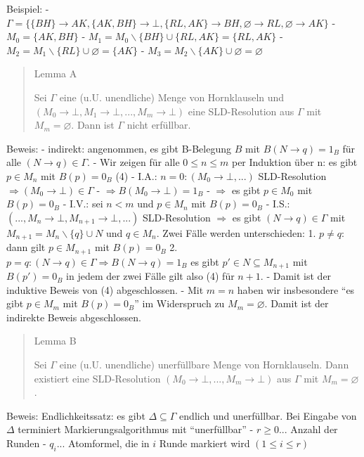 \documentclass[a4paper]{article}
\begin{document}
\begin{multicols}{3}
  Beispiel: -
  $\Gamma =\{\{BH\}\rightarrow AK,\{AK,BH\}\rightarrow\bot,\{RL,AK\}\rightarrow BH,\varnothing\rightarrow RL,\varnothing\rightarrow AK\}$
  - $M_0 =\{AK,BH\}$ - $M_1 =M_0 \backslash\{BH\}\cup\{RL,AK\}=\{RL,AK\}$
  - $M_2 =M_1 \backslash\{RL\}\cup\varnothing =\{AK\}$ -
  $M_3 =M_2 \backslash\{AK\}\cup\varnothing =\varnothing$

  \begin{quote}
    Lemma A

    Sei $\Gamma$ eine (u.U. unendliche) Menge von Hornklauseln und
    $(M_0\rightarrow\bot, M_1\rightarrow\bot,... , M_m\rightarrow\bot)$ eine
    SLD-Resolution aus $\Gamma$ mit $M_m=\varnothing$. Dann ist $\Gamma$
    nicht erfüllbar.
  \end{quote}

  Beweis: - indirekt: angenommen, es gibt B-Belegung $B$ mit
  $B(N\rightarrow q) = 1_B$ für alle $(N\rightarrow q)\in\Gamma$. - Wir
  zeigen für alle $0\leq n\leq m$ per Induktion über n: es gibt $p\in M_n$
  mit $B(p) = 0_B$ (4) - I.A.: $n=0:(M_0 \rightarrow\bot,...)$
  SLD-Resolution $\Rightarrow(M_0\rightarrow\bot)\in\Gamma$ -
  $\Rightarrow B(M_0\rightarrow\bot) = 1_B$ - $\Rightarrow$ es gibt
  $p\in M_0$ mit $B(p) = 0_B$ - I.V.: sei $n<m$ und $p\in M_n$ mit
  $B(p) = 0_B$ - I.S.:
  $(... ,M_n\rightarrow\bot,M_{n+ 1}\rightarrow\bot,...)$ SLD-Resolution
  $\Rightarrow$ es gibt $(N\rightarrow q)\in\Gamma$ mit
  $M_{n+1} =M_n\backslash\{q\}\cup N$ und $q\in M_n$. Zwei Fälle werden
  unterschieden: 1. $p\not=q$: dann gilt $p\in M_{n+1}$ mit $B(p) = 0_B$
  2. $p=q:(N\rightarrow q)\in\Gamma\Rightarrow B(N\rightarrow q) = 1_B$ es
  gibt $p'\in N\subseteq M_{n+1}$ mit $B(p')=0_B$ in jedem der zwei Fälle
  gilt also (4) für $n+1$. - Damit ist der induktive Beweis von (4)
  abgeschlossen. - Mit $m=n$ haben wir insbesondere ``es gibt $p\in M_m$
  mit $B(p) = 0_B$'' im Widerspruch zu $M_m=\varnothing$. Damit ist der
  indirekte Beweis abgeschlossen.

  \begin{quote}
    Lemma B

    Sei $\Gamma$ eine (u.U. unendliche) unerfüllbare Menge von Hornklauseln.
    Dann existiert eine SLD-Resolution
    $(M_0\rightarrow\bot,...,M_m\rightarrow\bot)$ aus $\Gamma$ mit
    $M_m=\varnothing$.
  \end{quote}

  Beweis: Endlichkeitssatz: es gibt $\Delta\subseteq\Gamma$ endlich und
  unerfüllbar. Bei Eingabe von$\Delta$ terminiert Markierungsalgorithmus
  mit ``unerfüllbar'' - $r\geq 0...$ Anzahl der Runden - $q_i...$
  Atomformel, die in $i$ Runde markiert wird $(1\leq i\leq r)$


\end{multicols}
\end{document}
